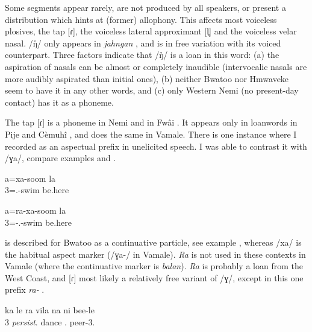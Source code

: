 	Some segments appear rarely, are not produced by all speakers, or present a distribution which hints at (former) allophony. This affects most voiceless plosives, the tap  [ɾ], the voiceless lateral approximant [l̥] and the voiceless velar nasal.  /ŋ̊/ only appears in \textit{jahngan} , and is in free variation with its voiced counterpart. Three factors indicate that /ŋ̊/ is a loan in this word: (a) the aspiration of nasals can be almost or completely inaudible (intervocalic nasals are more audibly aspirated than initial ones), (b) neither Bwatoo nor Hmwaveke seem to have it in any other words, and (c) only Western Nemi (no present-day contact) has it as a phoneme. 
	
	The tap  [ɾ] is a phoneme in Nemi and in Fwâi \parencite[18; 19]{ozanne-rivierre_phonologie_1982}. It appears only in loanwords in Pije \parencite[17]{ozanne-rivierre_phonologie_1982} and Cèmuhî \parencite[21]{rivierre_langue_1980}, and does the same in Vamale. There is one instance where I recorded  as an aspectual prefix  in unelicited speech. I was able to contrast it with  /ɣa/, compare examples  and .
	
	\ea
	\label{ex:x}
		\gll a=xa-soom la\\	
	 3=.-swim be.here\\
	\glt {}
	\z
	
	
	\ea\label{ex:r}
	\gll a=ra-xa-soom la\\
	 3=-.-swim be.here\\	
	\glt {}
		\z
	
	 is described for Bwatoo as a continuative particle, see example  \parencite[57]{rivierre_bwatoo_2006}, whereas  /xa/ is the habitual aspect marker (/ɣa-/ in Vamale). \textit{Ra} is not used in these contexts in Vamale (where the continuative marker is \textit{balan}). \textit{Ra} is probably a loan from the West Coast, and [ɾ] most likely a relatively free variant of /ɣ/, except in this one prefix \textit{ra-} .
	
	\ea \label{ex:Bwatoo_ra}	
	\gll ka le ra vila na ni bee-le\\
	  3 \textit{persist}. dance  . peer-3.\\
	\glt {}
	\z
	
